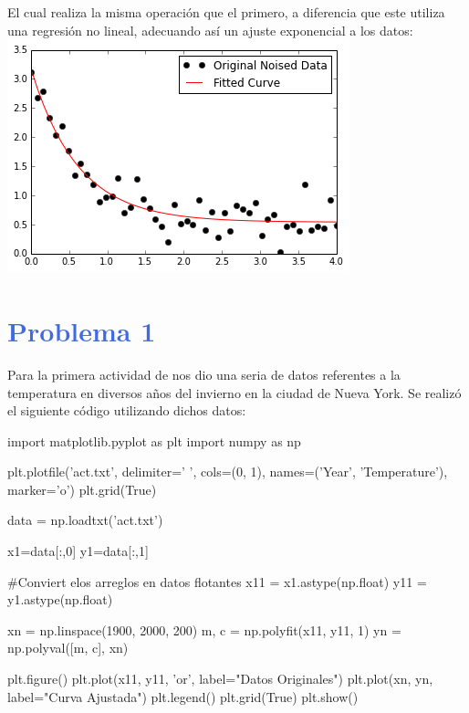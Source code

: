 \documentclass[12pt]{article}
\begin{document}
El cual realiza la misma operación que el primero, a diferencia que este utiliza una regresión no lineal, adecuando así un ajuste exponencial a los datos:
\includegraphics{4d.png}
\pagebreak
\section*{\textcolor{RoyalBlue}{Problema 1}}
Para la primera actividad de nos dio una seria de datos referentes a la temperatura en diversos años del invierno en la ciudad de Nueva York. Se realizó el siguiente código utilizando dichos datos:
\begin{center}
\begin{boxedverbatim}
import matplotlib.pyplot as plt 
import numpy as np

plt.plotfile('act.txt', delimiter=' ', cols=(0, 1), 
             names=('Year', 'Temperature'), marker='o') 
plt.grid(True)

data = np.loadtxt('act.txt')

x1=data[:,0] 
y1=data[:,1] 

#‎Conviert elos arreglos en datos flotantes
x11 = x1.astype(np.float)
y11 = y1.astype(np.float)

xn = np.linspace(1900, 2000, 200)
m, c = np.polyfit(x11, y11, 1)
yn = np.polyval([m, c], xn)

plt.figure()
plt.plot(x11, y11, 'or', label="Datos Originales")
plt.plot(xn, yn, label="Curva Ajustada")
plt.legend()
plt.grid(True)
plt.show()

\end{boxedverbatim}
\end{center}
\end{document}
